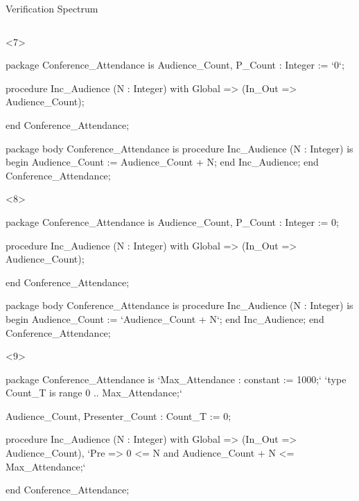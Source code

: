 \documentclass{beamer}
\begin{document}
\begin{frame}[fragile]{Verification Spectrum}
\begin{columns}
\begin{column}{9cm}
      \begin{onlyenv}<7>
      \begin{pxcode}[language=SPARK,style=magic,gobble=8]
        package Conference_Attendance
        is
           Audience_Count, P_Count : Integer := `0`;

           procedure Inc_Audience (N : Integer)
           with Global => (In_Out => Audience_Count);

        end Conference_Attendance;

        package body Conference_Attendance
        is
           procedure Inc_Audience (N : Integer)
           is
           begin
              Audience_Count := Audience_Count + N;
           end Inc_Audience;
        end Conference_Attendance;
      \end{pxcode}
      \end{onlyenv}

      \begin{onlyenv}<8>
      \begin{pxcode}[language=SPARK,style=magic,gobble=8]
        package Conference_Attendance
        is
           Audience_Count, P_Count : Integer := 0;

           procedure Inc_Audience (N : Integer)
           with Global => (In_Out => Audience_Count);

        end Conference_Attendance;

        package body Conference_Attendance
        is
           procedure Inc_Audience (N : Integer)
           is
           begin
              Audience_Count := `Audience_Count + N`;
           end Inc_Audience;
        end Conference_Attendance;
      \end{pxcode}
      \end{onlyenv}

      \begin{onlyenv}<9>
      \begin{pxcode}[language=SPARK,style=magic,gobble=8]
        package Conference_Attendance
        is
           `Max_Attendance : constant := 1000;`
           `type Count_T is range 0 .. Max_Attendance;`

           Audience_Count, Presenter_Count : Count_T := 0;

           procedure Inc_Audience (N : Integer)
           with Global => (In_Out => Audience_Count),
                `Pre    => 0 <= N and Audience_Count + N <= Max_Attendance;`

        end Conference_Attendance;


\end{pxcode}
\end{onlyenv}
\end{column}
\end{columns}
\end{frame}
\end{document}
